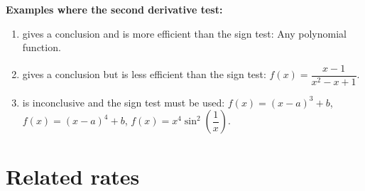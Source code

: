 \documentclass[12pt]{article}
\begin{document}
\vspace{2cm}

\noindent \textbf{Examples where the second derivative test:}
\begin{enumerate}[1.]
    \item gives a conclusion and is more efficient than the sign test: Any polynomial function.
    
    \vspace{0.5cm}
    
    \item gives a conclusion but is less efficient than the sign test: $f(x) = \dfrac{x-1}{x^2 - x + 1}$.
    
    \vspace{0.5cm}
    
    \item is inconclusive and the sign test must be used: $f(x) = (x-a)^3 + b$, $f(x) = (x-a)^4 + b$, $f(x) = x^4 \sin^2\left(\dfrac{1}{x}\right)$.
\end{enumerate}

\section*{Related rates}
\end{document}
